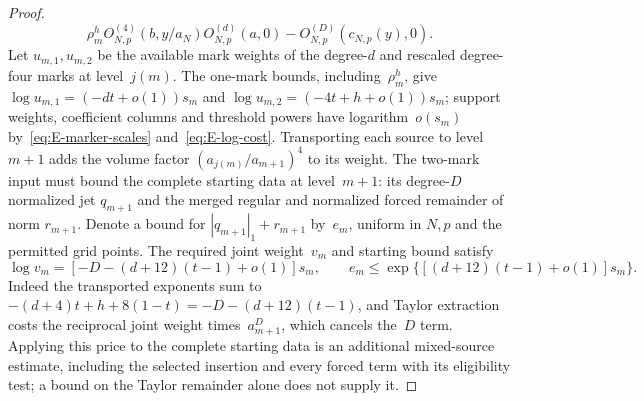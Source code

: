 \begin{proof}
\begin{equation*}
\rho_m^h O_{N,p}^{(4)}(b,y/a_N)O_{N,p}^{(d)}(a,0)
 -O_{N,p}^{(D)}(c_{N,p}(y),0).
\end{equation*}
Let $u_{m,1},u_{m,2}$ be the available mark weights of the degree-$d$ and rescaled degree-four marks at level~$j(m)$. The one-mark bounds, including~$\rho_m^h$, give $\log u_{m,1}=(-dt+o(1))s_m$ and $\log u_{m,2}=(-4t+h+o(1))s_m$; support weights, coefficient columns and threshold powers have logarithm~$o(s_m)$ by~\eqref{eq:E-marker-scales} and~\eqref{eq:E-log-cost}. Transporting each source to level~$m+1$ adds the volume factor $(a_{j(m)}/a_{m+1})^4$ to its weight. The two-mark input must bound the complete starting data at level~$m+1$: its degree-$D$ normalized jet $q_{m+1}$ and the merged regular and normalized forced remainder of norm $r_{m+1}$. Denote a bound for $|q_{m+1}|_1+r_{m+1}$ by~$e_m$, uniform in $N,p$ and the permitted grid points. The required joint weight~$v_m$ and starting bound satisfy
\begin{equation}\label{eq:G-annular-cost}
\log v_m=[-D-(d+12)(t-1)+o(1)]s_m,\qquad
e_m\le\exp\{[(d+12)(t-1)+o(1)]s_m\}.
\end{equation}
Indeed the transported exponents sum to $-(d+4)t+h+8(1-t)=-D-(d+12)(t-1)$, and Taylor extraction costs the reciprocal joint weight times~$a_{m+1}^D$, which cancels the~$D$ term. Applying this price to the complete starting data is an additional mixed-source estimate, including the selected insertion and every forced term with its eligibility test; a bound on the Taylor remainder alone does not supply it.


\end{proof}
